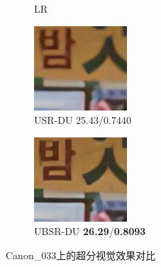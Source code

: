 \begin{figure}[htbp]
\begin{subfigure}{0.3\textwidth}
        \caption{LR} 
    \end{subfigure}
    \hfill
    \begin{subfigure}{0.3\textwidth}
        \includegraphics[width=\linewidth]{imgs/USR_DU_25.43_0.7440_Canon_033.png}
        \caption{USR-DU 25.43/0.7440} 
    \end{subfigure}
    \hfill
    \begin{subfigure}{0.3\textwidth}
        \includegraphics[width=\linewidth]{imgs/UBSR_DU_26.29_0.8093_Canon_033.png}
        \caption{UBSR-DU \textbf{26.29}/\textbf{0.8093}} 
    \end{subfigure}
    \caption{Canon\_033上的超分视觉效果对比}
    \label{fig:Canon033}
\end{figure}



